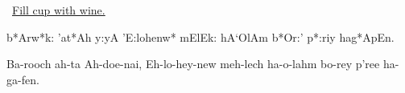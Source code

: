 \documentclass[12pt]{article}
\newenvironment{hebrewPrayer}
    {\begin{cjhebrew}
     \Large
    }
    { 
    \end{cjhebrew}
    }
\newenvironment{hebrewTransliteration}{}{\par}
\newcommand{\hebrewVowelOh}{\textrm{\hspace{0.2em}}o\textrm{\hspace{-0.2em}}}
\newcommand{\hebrewVowelTL}{A} %
\newcommand{\hebrewVowelTripleDotL}{E} %
\newcommand{\hebrewVowelDotDotL}{e} %
\newcommand{\hebrewVowelL}{:}
\newcommand{\hebrewVowelLineL}{a}
\newcommand{\transliterateAdonai}{Ah-doe-nai}
\newcommand{\transliterateEloheinu}{Eh-lo-hey-new}
\newcommand{\baruchAdonai}{b*Arw*k: 'at*Ah y:yA}
\newcommand{\transliterateBaruchAdonai}{Ba-rooch ah-ta {\transliterateAdonai}}
\newcommand{\baruchHaolam}{{\baruchAdonai} 'E:loh{\hebrewVowelDotDotL}nw* mElEk: hA`OlAm}
\newcommand{\transliterateBaruchHaolam}{{\transliterateBaruchAdonai}, {\transliterateEloheinu} meh-lech ha-o-lahm}
\newcommand{\baruchHagafen}{{\baruchHaolam} b*Or:' p*:riy hag*{\hebrewVowelTL}pEn}
\newcommand{\transliterateBaruchHagafen}{{\transliterateBaruchHaolam} bo-rey p'ree ha-ga-fen.}
\newcommand{\inlineSederAction}[1]{\faHandORight{}~\underline{#1}}
\newcommand{\sederAction}[1]{\inlineSederAction{#1}\par}
\begin{document}


\sederAction{Fill cup with wine.}

\begin{minipage}[t]{\textwidth}
    \begin{hebrewPrayer}
        \baruchHagafen\textrm{.}
    \end{hebrewPrayer}

    \begin{hebrewTransliteration}
        {\transliterateBaruchHagafen} %
    \end{hebrewTransliteration}
    

\end{minipage}
\end{document}
